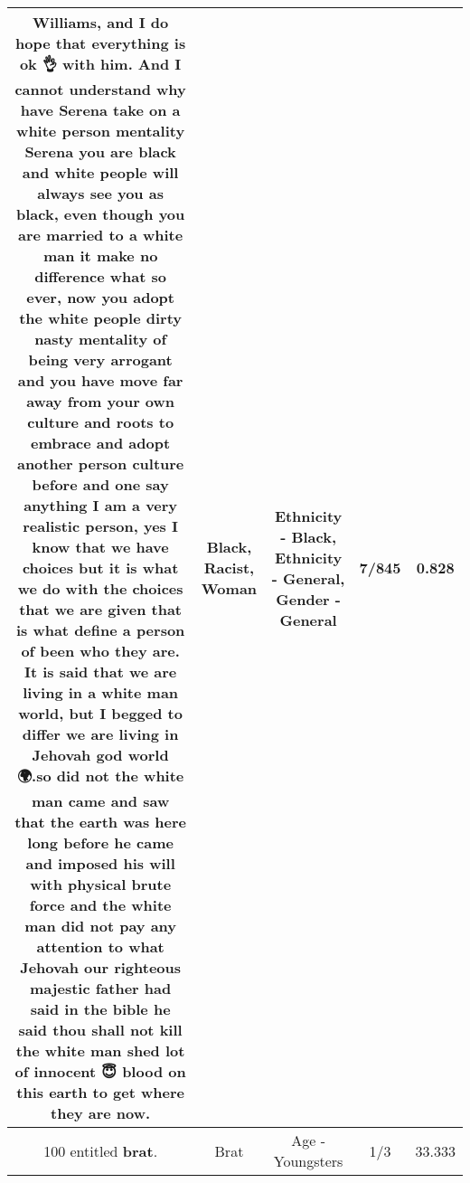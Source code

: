 \documentclass[11pt]{article}
\newlength\mylength
\begin{document}
\begin{center}
\begin{longtable}{|C{.65\mylength}|C{.30\mylength}|C{.12\mylength}|C{.12\mylength}|C{.12\mylength}|}
Williams, and I do hope that everything is ok 👌 with him. And I cannot understand why have Serena take on a white person mentality Serena you are \textbf{black} and white people will always see you as \textbf{black}, even though you are married to a white man it make no difference what so ever, now you adopt the white people dirty nasty mentality of being very arrogant and you have move far away from your own culture and roots to embrace and adopt another person culture before and one say anything I am a very realistic person, yes I know that we have choices but it is what we do with the choices that we are given that is what define a person of been who they are. It is said that we are living in a white man world, but I begged to differ we are living in Jehovah god world 🌍.so did not the white man came and saw that the earth was here long before he came and imposed his will with physical brute force and the white man did not pay any attention to what Jehovah our righteous majestic father had said in the bible he said thou shall  not kill the white man shed lot of innocent 😇 blood on this earth to get where they are now.\normalsize   & Black, Racist, Woman & Ethnicity - Black, Ethnicity - General, Gender - General & 7/845 & 0.828 \\  \hline
  \small 100 entitled \textbf{brat}.\normalsize   & Brat & Age - Youngsters & 1/3 & 33.333 \\  \hline

\end{longtable}
\end{center}
\end{document}
